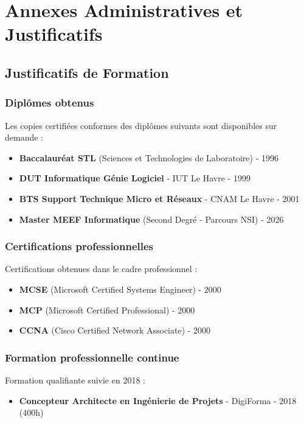 \chapter{Annexes Administratives et Justificatifs}

\section{Justificatifs de Formation}

\subsection{Diplômes obtenus}
Les copies certifiées conformes des diplômes suivants sont disponibles sur demande :

\begin{itemize}[leftmargin=*]
    \item \textbf{Baccalauréat STL} (Sciences et Technologies de Laboratoire) - 1996
    \item \textbf{DUT Informatique Génie Logiciel} - IUT Le Havre - 1999  
    \item \textbf{BTS Support Technique Micro et Réseaux} - CNAM Le Havre - 2001
    \item \textbf{Master MEEF Informatique} (Second Degré - Parcours NSI) - 2026
\end{itemize}

\subsection{Certifications professionnelles}
Certifications obtenues dans le cadre professionnel :

\begin{itemize}[leftmargin=*]
    \item \textbf{MCSE} (Microsoft Certified Systems Engineer) - 2000
    \item \textbf{MCP} (Microsoft Certified Professional) - 2000
    \item \textbf{CCNA} (Cisco Certified Network Associate) - 2000
\end{itemize}

\subsection{Formation professionnelle continue}
Formation qualifiante suivie en 2018 :

\begin{itemize}[leftmargin=*]
    \item \textbf{Concepteur Architecte en Ingénierie de Projets} - DigiForma - 2018 (400h)
\end{itemize}

